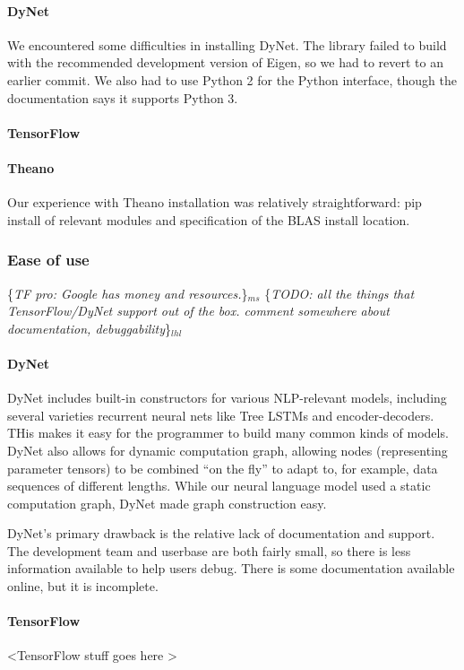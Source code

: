 \documentclass{article}
\newcommand{\ms}[1]{{\color{cyan}\{\textit{#1}\}$_{ms}$}}
\newcommand{\lhl}[1]{{\color{magenta}\{\textit{#1}\}$_{lhl}$}}
\begin{document}
\paragraph{DyNet} We encountered some difficulties in installing DyNet. The library failed to build with the recommended development version of Eigen, so we had to revert to an earlier commit. We also had to use Python 2 for the Python interface, though the documentation says it supports Python 3.

\paragraph{TensorFlow}

\paragraph{Theano} Our experience with Theano installation was relatively straightforward: pip install of relevant modules and specification of the BLAS install location.

\subsubsection{Ease of use}
\ms{TF pro: Google has money and resources.}
\lhl{TODO: all the things that TensorFlow/DyNet support out of the box.
comment somewhere about documentation, debuggability}

\paragraph{DyNet}
DyNet includes built-in constructors for various NLP-relevant models, including several varieties recurrent neural nets like Tree LSTMs and encoder-decoders. THis makes it easy for the programmer to build many common kinds of models. DyNet also allows for dynamic computation graph, allowing nodes (representing parameter tensors) to be combined ``on the fly'' to adapt to, for example, data sequences of different lengths. While our neural language model used a static computation graph, DyNet made graph construction easy.

DyNet's primary drawback is the relative lack of documentation and support. The development team and userbase are both fairly small, so there is less information available to help users debug. There is some documentation available online, but it is incomplete.

\paragraph{TensorFlow} \textless TensorFlow stuff goes here \textgreater
\end{document}
